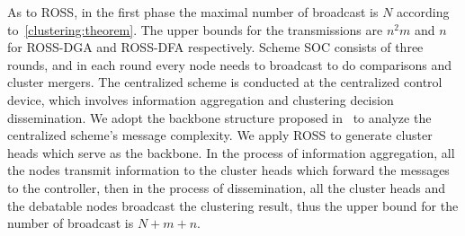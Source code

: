 \documentclass[times]{ettauth}
\theoremstyle{mytheoremstyle}
\theoremstyle{mytheoremstyle}
\theoremstyle{mytheoremstyle}
\begin{document}
As to ROSS, in the first phase the maximal number of broadcast is $N$ according to~\ref{clustering:theorem}.
The upper bounds for the transmissions are $n^2m$ and $n$ for ROSS-DGA and ROSS-DFA respectively.
Scheme SOC consists of three rounds, and in each round every node needs to broadcast to do comparisons and cluster mergers.
The centralized scheme is conducted at the centralized control device, which involves information aggregation and clustering decision dissemination.
We adopt the backbone structure proposed in~\cite{Efficient_broadcasting_gathering_adhoc} to analyze the centralized scheme's message complexity.
We apply ROSS to generate cluster heads which serve as the backbone.
In the process of information aggregation, all the nodes transmit information to the cluster heads which forward the messages to the controller, then in the process of dissemination, all the cluster heads and the debatable nodes broadcast the clustering result, thus the upper bound for the number of broadcast is $N+m+n$.
\end{document}
